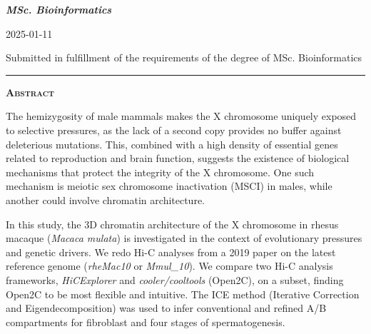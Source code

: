 \documentclass[
  11pt,
  a4paper,
]{scrbook}
\let\oldemph\emph
\renewcommand\emph[1]{\oldemph{\color{gray}#1}}
\begin{document}
{{\bfseries\Large\textit{MSc. Bioinformatics} \par}
\vspace{3ex}

{\large 2025-01-11 \par}
\vspace{3ex}

\vspace{10ex}
{\small Submitted in fulfillment of the requirements
of the degree of MSc. Bioinformatics \par}
\pagebreak


\vspace*{\fill} %
\noindent
\begin{minipage}{.8\textwidth}
    \centering
    \hspace*{\fill}\rule{0.5\textwidth}{0.4pt}\hspace*{\fill} %
    \par \vspace{2em} %
    {\Large\bfseries\scshape Abstract} %
    \par %
    \vspace{1em} %
    \justifying %
    The hemizygosity of male mammals makes the X chromosome uniquely
exposed to selective pressures, as the lack of a second copy provides no
buffer against deleterious mutations. This, combined with a high density
of essential genes related to reproduction and brain function, suggests
the existence of biological mechanisms that protect the integrity of the
X chromosome. One such mechanism is meiotic sex chromosome inactivation
(MSCI) in males, while another could involve chromatin architecture.

In this study, the 3D chromatin architecture of the X chromosome in
rhesus macaque (\emph{Macaca mulata}) is investigated in the context of
evolutionary pressures and genetic drivers. We redo Hi-C analyses from a
2019 paper on the latest reference genome (\emph{rheMac10} or
\emph{Mmul\_10}). We compare two Hi-C analysis frameworks,
\emph{HiCExplorer} and \emph{cooler/cooltools} (Open2C), on a subset,
finding Open2C to be most flexible and intuitive. The ICE method
(Iterative Correction and Eigendecomposition) was used to infer
conventional and refined A/B compartments for fibroblast and four stages
of spermatogenesis.


\end{minipage}}
\end{document}
